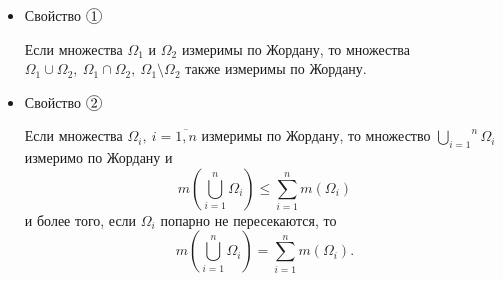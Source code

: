 \begin{itemize}
    \item Свойство $ \circled{1} $
          \begin{statement}
              Если множества $ \Omega_1 $ и $ \Omega_2 $ измеримы по Жордану, то множества $ \Omega_1 \cup \Omega_2, \ \Omega_1 \cap \Omega_2, \ \Omega_1 \setminus \Omega_2 $ также измеримы по Жордану.
          \end{statement}

    \item Свойство $ \circled{2} $
          \begin{statement}
              Если множества $ \Omega_i, \ i = \overline{1,n} $ измеримы по Жордану, то множество $ \overset{n}{\underset{i=1}{\bigcup}}\Omega_i $ измеримо по Жордану и
              \[
                  m\left(\overset{n}{\underset{i=1}{\bigcup}}\Omega_i\right) \leqslant \sum_{i=1}^{n}m(\Omega_i)
              \]
              и более того, если $ \Omega_i $ попарно не пересекаются, то
              \[
                  m\left(\overset{n}{\underset{i=1}{\bigcup}}\Omega_i\right) = \sum_{i=1}^{n}m(\Omega_i).
              \]
          \end{statement}
\end{itemize}
